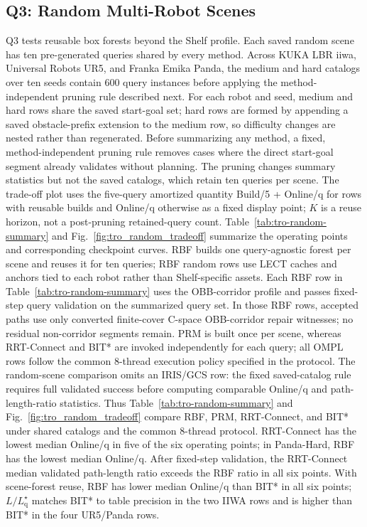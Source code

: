 \documentclass[journal]{IEEEtran}
\DeclareRobustCommand{\textsc}[1]{\textnormal{\MakeUppercase{#1}}}
\newcommand{\rbf}{\textsc{RBF}}
\newcommand{\cspace}{\mbox{C-space}}
\newcommand{\onlineq}{\mbox{Online/q}}
\begin{document}
\subsection{Q3: Random Multi-Robot Scenes}
\label{sec:exp_generalization}

Q3 tests reusable box forests beyond the Shelf profile. Each saved random scene
has ten pre-generated queries shared by every method. Across KUKA LBR iiwa,
Universal Robots UR5, and Franka Emika Panda, the medium and hard catalogs over
ten seeds contain 600 query instances before applying the method-independent
pruning rule described next. For each robot and seed, medium
and hard rows share the saved start-goal set; hard rows are formed by appending
a saved obstacle-prefix extension to the medium row, so difficulty changes are
nested rather than regenerated. Before summarizing any method, a
fixed, method-independent pruning rule removes cases where the direct
start-goal segment already validates without planning. The pruning changes
summary statistics but not the saved catalogs, which retain ten queries per
scene. The trade-off plot
uses the five-query amortized quantity Build/5 + \onlineq{} for rows with
reusable builds and \onlineq{} otherwise as a fixed display point; \(K\) is a
reuse horizon, not a post-pruning retained-query count.
Table~\ref{tab:tro-random-summary} and Fig.~\ref{fig:tro_random_tradeoff}
summarize the operating points and corresponding checkpoint curves.
\rbf{} builds one query-agnostic forest per scene and reuses it for ten queries;
\rbf{} random rows use LECT caches and anchors tied to each robot rather than
Shelf-specific assets. Each \rbf{} row in Table~\ref{tab:tro-random-summary}
uses the OBB-corridor profile and passes fixed-step query validation on the
summarized query set. In those \rbf{} rows, accepted paths use only
converted finite-cover \cspace{} OBB-corridor repair witnesses; no residual
non-corridor segments remain.
PRM is built once per scene, whereas \mbox{RRT-Connect} and BIT* are invoked
independently for each query; all OMPL rows follow the common 8-thread execution
policy specified in the protocol.
The random-scene comparison omits an \mbox{IRIS/GCS} row:
the fixed saved-catalog rule requires full validated success before computing
comparable \onlineq{} and path-length-ratio statistics. Thus
Table~\ref{tab:tro-random-summary} and Fig.~\ref{fig:tro_random_tradeoff}
compare \rbf{}, PRM, \mbox{RRT-Connect}, and BIT* under shared catalogs and
the common 8-thread protocol.
\mbox{RRT-Connect} has the lowest median \onlineq{} in five of the six
operating points; in Panda-Hard, \rbf{} has the lowest median
\onlineq{}. After fixed-step validation, the \mbox{RRT-Connect} median
validated path-length ratio exceeds the \rbf{} ratio in all six points. With
scene-forest reuse,
\rbf{} has lower median \onlineq{} than BIT* in all six points;
\(L/L^\star_{\mathrm{q}}\) matches BIT* to table precision in the two IIWA rows
and is higher than BIT* in the four UR5/Panda rows.
\end{document}

